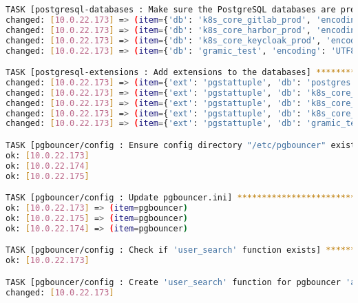 \begin{flushleft}
\begin{lstlisting}[language=bash, caption=Deploy - Anhang - Deployt,captionpos=b,label={lst:deploy-appendix-deployt},breaklines=true]
TASK [postgresql-databases : Make sure the PostgreSQL databases are present] **************************************************************************************************************************************
changed: [10.0.22.173] => (item={'db': 'k8s_core_gitlab_prod', 'encoding': 'UTF8', 'lc_collate': 'en_US.UTF-8', 'lc_ctype': 'en_US.UTF-8', 'owner': 'xksgr_sks1160_gitlab'})
changed: [10.0.22.173] => (item={'db': 'k8s_core_harbor_prod', 'encoding': 'UTF8', 'lc_collate': 'en_US.UTF-8', 'lc_ctype': 'en_US.UTF-8', 'owner': 'xksgr_sks1172_harbor'})
changed: [10.0.22.173] => (item={'db': 'k8s_core_keycloak_prod', 'encoding': 'UTF8', 'lc_collate': 'en_US.UTF-8', 'lc_ctype': 'en_US.UTF-8', 'owner': 'xksgr_sks1195_kcsso'})
changed: [10.0.22.173] => (item={'db': 'gramic_test', 'encoding': 'UTF8', 'lc_collate': 'en_US.UTF-8', 'lc_ctype': 'en_US.UTF-8', 'owner': 'postgres'})

TASK [postgresql-extensions : Add extensions to the databases] ****************************************************************************************************************************************************
changed: [10.0.22.173] => (item={'ext': 'pgstattuple', 'db': 'postgres'})
changed: [10.0.22.173] => (item={'ext': 'pgstattuple', 'db': 'k8s_core_gitlab_prod'})
changed: [10.0.22.173] => (item={'ext': 'pgstattuple', 'db': 'k8s_core_harbor_prod'})
changed: [10.0.22.173] => (item={'ext': 'pgstattuple', 'db': 'k8s_core_keycloak_prod'})
changed: [10.0.22.173] => (item={'ext': 'pgstattuple', 'db': 'gramic_test'})

TASK [pgbouncer/config : Ensure config directory "/etc/pgbouncer" exist] ******************************************************************************************************************************************
ok: [10.0.22.173]
ok: [10.0.22.174]
ok: [10.0.22.175]

TASK [pgbouncer/config : Update pgbouncer.ini] ********************************************************************************************************************************************************************
ok: [10.0.22.173] => (item=pgbouncer)
ok: [10.0.22.175] => (item=pgbouncer)
ok: [10.0.22.174] => (item=pgbouncer)

TASK [pgbouncer/config : Check if 'user_search' function exists] **************************************************************************************************************************************************
ok: [10.0.22.173]

TASK [pgbouncer/config : Create 'user_search' function for pgbouncer 'auth_query' option] *************************************************************************************************************************
changed: [10.0.22.173]


\end{lstlisting}
\end{flushleft}
